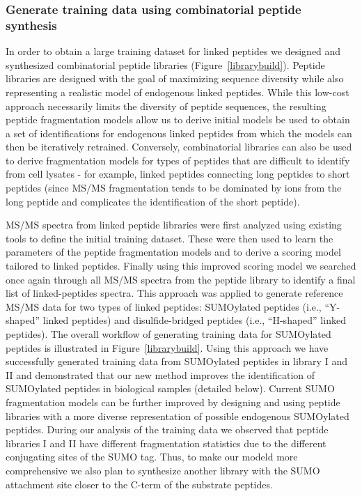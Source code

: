 \documentclass[arial,11pt]{article}
\begin{document}
\subsubsection{Generate training data using combinatorial peptide synthesis}

In order to obtain a large training dataset for linked peptides we designed and synthesized combinatorial peptide libraries (Figure~\ref{librarybuild}). Peptide libraries are designed with the goal of maximizing sequence diversity while also representing a realistic model of endogenous linked peptides. While this low-cost approach necessarily limits the diversity of peptide sequences, the resulting peptide fragmentation models allow us to derive initial models be used to obtain a set of identifications for endogenous linked peptides from which the models can then be iteratively retrained. Conversely, combinatorial libraries can also be used to derive fragmentation models for types of peptides that are difficult to identify from cell lysates \-- for example, linked peptides connecting long peptides to short peptides (since MS/MS fragmentation tends to be dominated by ions from the long peptide and complicates the identification of the short peptide).

MS/MS spectra from linked peptide libraries were first analyzed using existing tools to define the initial training dataset. These were then used to learn the parameters of the peptide fragmentation models and to derive a scoring model tailored to linked peptides. Finally using this improved scoring model we searched once again through all MS/MS spectra from the peptide library to identify a final list of linked-peptides spectra. This approach was applied to generate reference MS/MS data for two types of linked peptides: SUMOylated peptides (i.e., ``Y-shaped'' linked peptides) and disulfide-bridged peptides (i.e., ``H-shaped'' linked peptides). The overall workflow of generating training data for SUMOylated peptides is illustrated in Figure~\ref{librarybuild}. Using this approach we have successfully generated training data from SUMOylated peptides in library I and II and demonstrated that our new method improves the identification of SUMOylated peptides in biological samples (detailed below). Current SUMO fragmentation models can be further improved by designing and using peptide libraries with a more diverse representation of possible endogenous SUMOylated peptides.
During our analysis of the training data we observed that peptide libraries I and II have different fragmentation statistics due to the different conjugating sites of the SUMO tag. Thus, to make our modeld more comprehensive we also plan to synthesize another library with the SUMO attachment site closer to the C-term of the substrate peptides.
\end{document}
